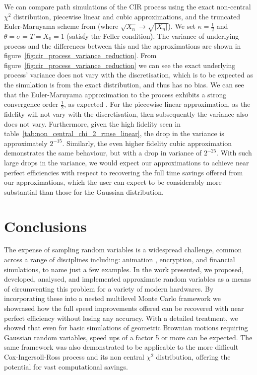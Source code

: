 \documentclass[manuscript,review]{acmart}
\begin{document}
We can compare path simulations of the CIR process using the exact non-central $ \chi^2 $ distribution, piecewise linear and cubic approximations, and the truncated Euler-Maruyama scheme from \citet{higham2002strong} (where $ \sqrt{X_n} \to \sqrt{\lvert X_n \rvert} $). We set $ \kappa= \tfrac{1}{2}$ and  $ \theta = \sigma =T = X_0 = 1 $ (satisfy the Feller condition). The variance of underlying process and the differences between this and the approximations are shown in figure~\ref{fig:cir_process_variance_reduction}. From figure~\ref{fig:cir_process_variance_reduction} we can see the exact underlying process' variance does not vary with the discretisation, which is to be expected as the simulation is from the exact distribution, and thus has no bias. We can see that the Euler-Maruyama approximation to the process exhibits a strong convergence order $ \tfrac{1}{2} $, as expected \citep{higham2002strong,gyongy1998note}. For the piecewise linear approximation, as the fidelity will not vary with the discretisation, then subsequently the variance also does not vary. Furthermore, given the high fidelity seen in table~\ref{tab:non_central_chi_2_rmse_linear}, the drop in the variance is approximately $ 2^{-15} $. Similarly, the even higher fidelity cubic approximation demonstrates the same behaviour, but with a drop in variance of $ 2^{-25} $. With such large drops in the variance, we would expect our approximations to achieve near perfect efficiencies with respect to recovering the full time savings offered from our approximations, which the user can expect to be considerably more substantial than those for the Gaussian distribution. 

\section{Conclusions}
\label{sec:conclusions}

The expense of sampling random variables is a widespread challenge, common across a range of disciplines including: animation \citep{lee2017vectorized}, encryption, and financial simulations, to name just a few examples. In the work presented, we proposed, developed, analysed, and implemented approximate random variables as a means of circumventing this problem for a variety of modern hardwares. By incorporating these into a nested multilevel Monte Carlo framework we showcased how the full speed improvements offered can be recovered with near perfect efficiency without losing any accuracy. With a detailed treatment, we showed that even for basic simulations of geometric Brownian motions requiring Gaussian random variables, speed ups of a factor 5 or more can be expected. The same framework was also demonstrated to be applicable to the more difficult Cox-Ingersoll-Ross process and its non central $ \chi^2 $ distribution, offering the potential for vast computational savings. 
\end{document}
